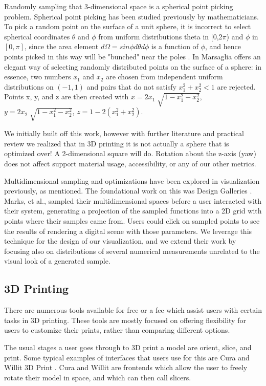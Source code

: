 \documentclass{sigchi}
\begin{document}
Randomly sampling that 3-dimensional space is a spherical point picking problem.  Spherical point picking has been studied previously by mathematicians.  To pick a random point on the surface of a unit sphere, it is incorrect to select spherical coordinates $\theta$ and $\phi$ from uniform distributions theta in [0,2$\pi$) and $\phi$ in $[0,\pi]$, since the area element $d\Omega=sin\phi d\theta d\phi$ is a function of $\phi$, and hence points picked in this way will be "bunched" near the poles \cite{wolfram}.  In \cite{sphere-point} Marsaglia offers an elegant way of selecting randomly distributed points on the surface of a sphere: in essence, two numbers $x_1$ and $x_2$ are chosen from independent uniform distributions on $(-1, 1)$ and pairs that do not satisfy $x_1^2 + x_2^2 < 1$ are rejected.  Points x, y, and z are then created with $x = 2x_1\sqrt[]{1-x_1^2-x_2^2}$, $y = 2x_2\sqrt[]{1-x_1^2-x_2^2}$, $z = 1 - 2(x_1^2 + x_2^2)$.

We initially built off this work, however with further literature and practical review we realized that in 3D printing it is not actually a sphere that is optimized over!  A 2-dimensional square will do.  Rotation about the z-axis (yaw) does not affect support material usage, accessibility, or any of our other metrics.

Multidimensional sampling and optimizations have been explored in visualization previously, as mentioned.  The foundational work on this was Design Galleries \cite{design-galleries}.  Marks, et al., sampled their multidimensional spaces before a user interacted with their system, generating a projection of the sampled functions into a 2D grid with points where their samples came from.  Users could click on sampled points to see the results of rendering a digital scene with those parameters.  We leverage this technique for the design of our visualization, and we extend their work by focusing also on distributions of several numerical measurements unrelated to the visual look of a generated sample.

\subsection{3D Printing}
There are numerous tools available for free or a fee which assist users with certain tasks in 3D printing.  These tools are mostly focused on offering flexibility for users to customize their prints, rather than comparing different options.

The usual stages a user goes through to 3D print a model are orient, slice, and print.  Some typical examples of interfaces that users use for this are Cura \cite{cura} and Willit 3D Print \cite{willit}.  Cura and Willit are frontends which allow the user to freely rotate their model in space, and which can then call slicers.
\end{document}
